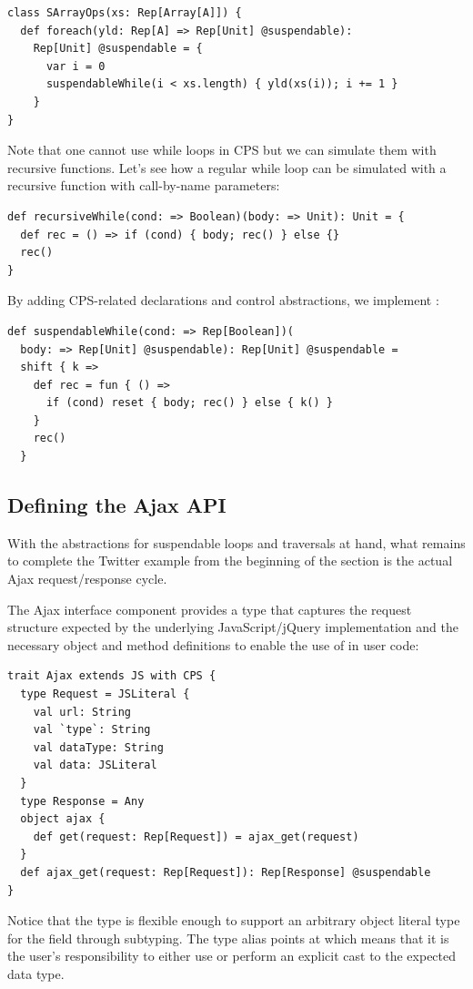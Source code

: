 \documentclass[runningheads,a4paper]{llncs}
\begin{document}
\begin{lstlisting}[caption=Suspendable foreach,label=code:suspendable_foreach]
class SArrayOps(xs: Rep[Array[A]]) {
  def foreach(yld: Rep[A] => Rep[Unit] @suspendable):
    Rep[Unit] @suspendable = {
      var i = 0
      suspendableWhile(i < xs.length) { yld(xs(i)); i += 1 }
    }
}
\end{lstlisting}
Note that one cannot use while loops in CPS but we can simulate them
with recursive functions. Let's see how a regular while loop can be
simulated with a recursive function with call-by-name parameters:
\begin{lstlisting}
def recursiveWhile(cond: => Boolean)(body: => Unit): Unit = {
  def rec = () => if (cond) { body; rec() } else {}
  rec()
}
\end{lstlisting}

By adding CPS-related declarations and control abstractions, we implement :

\begin{lstlisting}
def suspendableWhile(cond: => Rep[Boolean])(
  body: => Rep[Unit] @suspendable): Rep[Unit] @suspendable =
  shift { k =>
    def rec = fun { () =>
      if (cond) reset { body; rec() } else { k() }
    }
    rec()
  }
\end{lstlisting}

\subsection{Defining the Ajax API}

With the abstractions for suspendable loops and traversals at hand,
what remains to complete the Twitter example from the beginning of the section
is the actual Ajax request/response cycle.

The Ajax interface component provides a type  that captures the 
request structure expected by the underlying JavaScript/jQuery implementation and the
necessary object and method definitions to enable the use of  in user
code:
\begin{lstlisting}
trait Ajax extends JS with CPS {
  type Request = JSLiteral {
    val url: String
    val `type`: String
    val dataType: String
    val data: JSLiteral
  }
  type Response = Any
  object ajax {
    def get(request: Rep[Request]) = ajax_get(request)
  }
  def ajax_get(request: Rep[Request]): Rep[Response] @suspendable
}
\end{lstlisting}

Notice that the  type is flexible enough to support an arbitrary object literal type for the  field through subtyping. The  type alias points at  which means that it is the user's responsibility to either use  or perform an explicit cast to the expected data type.
\end{document}
